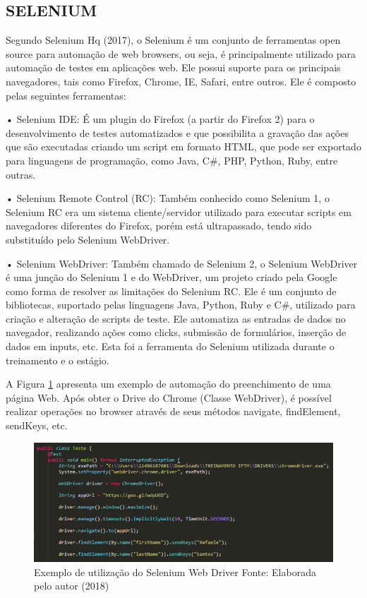\subsection{SELENIUM}
Segundo Selenium Hq (2017)\nocite{SELENIUMHQ}, o Selenium é um conjunto de ferramentas open source para automação de web browsers, ou seja, é principalmente utilizado para automação de testes em aplicações web. Ele possui suporte para os principais navegadores, tais como Firefox, Chrome, IE, Safari, entre outros. Ele é composto pelas seguintes ferramentas:

•	Selenium IDE: É um plugin do Firefox (a partir do Firefox 2) para o desenvolvimento de testes automatizados e que possibilita a gravação das ações que são executadas criando um script em formato HTML, que pode ser exportado para linguagens de programação, como Java, C\#, PHP, Python, Ruby, entre outras. 

•	Selenium Remote Control (RC): Também conhecido como Selenium 1, o Selenium RC era um sistema cliente/servidor utilizado para executar scripts em navegadores diferentes do Firefox, porém está ultrapassado, tendo sido substituído pelo Selenium WebDriver.

•	Selenium WebDriver: Também chamado de Selenium 2, o Selenium WebDriver é uma junção do Selenium 1 e do WebDriver, um projeto criado pela Google como forma de resolver as limitações do Selenium RC. Ele é um conjunto de bibliotecas, suportado pelas linguagens Java, Python, Ruby e C\#, utilizado para criação e alteração de scripts de teste. Ele automatiza as entradas de dados no navegador, realizando ações como clicks, submissão de formulários, inserção de dados em inputs, etc. Esta foi a ferramenta do Selenium utilizada durante o treinamento e o estágio.

A Figura \ref{selenium} apresenta um exemplo de automação do preenchimento de uma página Web. Após obter o Drive do Chrome (Classe WebDriver), é possível realizar operações no browser através de seus métodos navigate, findElement, sendKeys, etc.

\begin{figure}[htb]
  \begin{center}
    \includegraphics[scale=0.85]{Imagens/selenium.png}
  \end{center}
  \caption{Exemplo de utilização do Selenium Web Driver
Fonte: Elaborada pelo autor (2018)}
  \label{selenium}
\end{figure}

